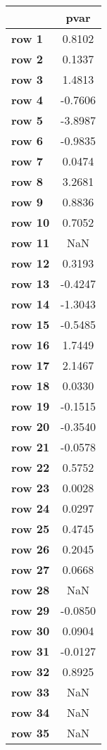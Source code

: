 \begin{tiny}\begin{tabular}{|l|c|}
\hline
&\textbf{pvar}\\\hline
\textbf{row 1}&0.8102\\\hline
\textbf{row 2}&0.1337\\\hline
\textbf{row 3}&1.4813\\\hline
\textbf{row 4}&-0.7606\\\hline
\textbf{row 5}&-3.8987\\\hline
\textbf{row 6}&-0.9835\\\hline
\textbf{row 7}&0.0474\\\hline
\textbf{row 8}&3.2681\\\hline
\textbf{row 9}&0.8836\\\hline
\textbf{row 10}&0.7052\\\hline
\textbf{row 11}&NaN\\\hline
\textbf{row 12}&0.3193\\\hline
\textbf{row 13}&-0.4247\\\hline
\textbf{row 14}&-1.3043\\\hline
\textbf{row 15}&-0.5485\\\hline
\textbf{row 16}&1.7449\\\hline
\textbf{row 17}&2.1467\\\hline
\textbf{row 18}&0.0330\\\hline
\textbf{row 19}&-0.1515\\\hline
\textbf{row 20}&-0.3540\\\hline
\textbf{row 21}&-0.0578\\\hline
\textbf{row 22}&0.5752\\\hline
\textbf{row 23}&0.0028\\\hline
\textbf{row 24}&0.0297\\\hline
\textbf{row 25}&0.4745\\\hline
\textbf{row 26}&0.2045\\\hline
\textbf{row 27}&0.0668\\\hline
\textbf{row 28}&NaN\\\hline
\textbf{row 29}&-0.0850\\\hline
\textbf{row 30}&0.0904\\\hline
\textbf{row 31}&-0.0127\\\hline
\textbf{row 32}&0.8925\\\hline
\textbf{row 33}&NaN\\\hline
\textbf{row 34}&NaN\\\hline
\textbf{row 35}&NaN\\\hline

\end{tabular}
\end{tiny}
